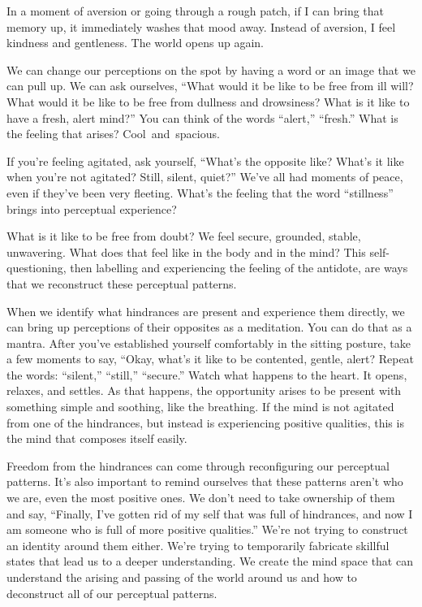 In a moment of aversion or going through a rough patch, if I can bring that memory up, it immediately washes that mood away. Instead of aversion, I feel kindness and gentleness. The world opens up again.

We can change our perceptions on the spot by having a word or an image that we can pull up. We can ask ourselves, ``What would it be like to be free from ill will? What would it be like to be free from dullness and \mbox{drowsiness}? What is it like to have a fresh, alert mind?'' You can think of the words ``alert,'' ``fresh.'' What is the feeling that arises? \mbox{Cool and spacious.}

If you're feeling agitated, ask yourself, ``What's the opposite like? What's it like when you're not agitated? Still, silent, quiet?'' We've all had moments of peace, even if they've been very fleeting. What's the feeling that the word ``stillness'' brings into perceptual experience?

What is it like to be free from doubt? We feel secure, grounded, stable, unwavering. What does that feel like in the body and in the mind? This self-questioning, then labelling and experiencing the feeling of the antidote, are ways that we reconstruct these perceptual patterns.

When we identify what hindrances are present and experience them directly, we can bring up perceptions of their opposites as a meditation. You can do that as a mantra. After you've established yourself comfortably in the sitting posture, take a few moments to say, ``Okay, what's it like to be contented, gentle, alert? Repeat the words: ``silent,'' ``still,'' ``secure.'' Watch what happens to the heart. It opens, relaxes, and settles. As that happens, the opportunity arises to be present with something simple and soothing, like the breathing. If the mind is not agitated from one of the hindrances, but instead is experiencing positive qualities, this is the mind that composes itself easily.

Freedom from the hindrances can come through reconfiguring our perceptual patterns. It's also important to remind ourselves that these patterns aren't who we are, even the most positive ones. We don't need to take ownership of them and say, ``Finally, I've gotten rid of my self that was full of hindrances, and now I am someone who is full of more positive qualities.'' We're not trying to construct an identity around them either. We're trying to temporarily fabricate skillful states that lead us to a deeper understanding. We create the mind space that can understand the arising and passing of the world around us and how to deconstruct all of our perceptual patterns.

